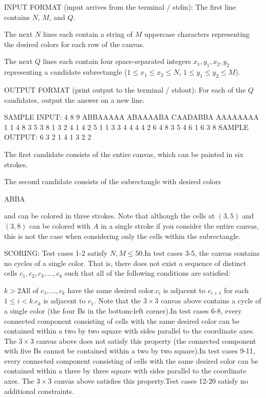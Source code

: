 \documentclass[12pt]{article}
\begin{document}
INPUT FORMAT (input arrives from the terminal / stdin):
The first line contains $N$, $M$, and $Q$.

The next $N$ lines each contain a string of $M$ uppercase characters
representing the desired colors for each row of the canvas.

The next $Q$ lines each contain four space-separated integers $x_1,y_1,x_2,y_2$
representing a candidate subrectangle ($1\le x_1\le x_2\le N$,
$1\le y_1\le y_2\le M$).

OUTPUT FORMAT (print output to the terminal / stdout):
For each of the $Q$ candidates, output the answer on a new line.

SAMPLE INPUT:
4 8 9
ABBAAAAA
ABAAAABA
CAADABBA
AAAAAAAA
1 1 4 8
3 5 3 8
1 3 2 4
1 4 2 5
1 1 3 3
4 4 4 4
2 6 4 8
3 5 4 6
1 6 3 8
SAMPLE OUTPUT: 
6
3
2
1
4
1
3
2
2

The first candidate consists of the entire canvas, which can be painted in six
strokes.

The second candidate consists of the subrectangle with desired colors


ABBA

and can be colored in three strokes. Note that although the cells at $(3,5)$ and
$(3,8)$ can be colored with $A$ in a single stroke if you consider the entire
canvas, this is not the case when considering only the cells within the
subrectangle.

SCORING:
Test cases 1-2 satisfy $N,M\le 50$.In test cases 3-5, the canvas contains no cycles of a single color. That is,
there does not exist a sequence of distinct cells $c_1,c_2,c_3,\ldots,c_k$  such
that all of the following conditions are satisfied:

$k>2$All of $c_1,\ldots,c_k$ have the same desired color.$c_i$ is adjacent to $c_{i+1}$ for each $1\le i<k$.$c_k$ is adjacent to $c_1$.
Note that the $3\times 3$ canvas above contains a cycle of a single color (the
four Bs in the bottom-left corner).In test cases 6-8, every connected component consisting of cells with the
same desired color can be contained within a two by two square with sides
parallel to the coordinate axes. The $3\times 3$ canvas above does not satisfy
this property (the connected component with five Bs cannot be contained within a
two by two square).In test cases 9-11, every connected component consisting of cells with the
same desired color can be contained within a three by three square with sides
parallel to the coordinate axes. The $3\times 3$ canvas above satisfies this
property.Test cases 12-20 satisfy no additional constraints.
\end{document}
